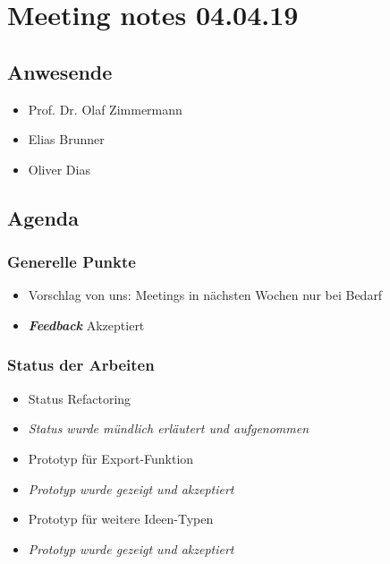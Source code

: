 \hypertarget{meeting-notes-040419}{%
\section*{Meeting notes 04.04.19}\label{meeting-notes-040419}}

\hypertarget{anwesende}{%
\subsection*{Anwesende}\label{anwesende}}

\begin{itemize}

\item
  Prof. Dr. Olaf Zimmermann
\item
  Elias Brunner
\item
  Oliver Dias
\end{itemize}

\hypertarget{agenda}{%
\subsection*{Agenda}\label{agenda}}

\hypertarget{generelle-punkte}{%
\subsubsection*{Generelle Punkte}\label{generelle-punkte}}

\begin{itemize}
\item Vorschlag von uns: Meetings in nächsten Wochen nur bei Bedarf
\item \emph{\textbf{Feedback}} Akzeptiert
\end{itemize}

\hypertarget{status-der-arbeiten}{%
\subsubsection*{Status der Arbeiten}\label{status-der-arbeiten}}
\begin{itemize}
\item Status Refactoring 
\item \emph{Status wurde mündlich erläutert und aufgenommen}
\item Prototyp für Export-Funktion 
\item \emph{Prototyp wurde gezeigt und akzeptiert}
\item Prototyp für weitere Ideen-Typen 
\item \emph{Prototyp wurde gezeigt und akzeptiert}
\end{itemize}

